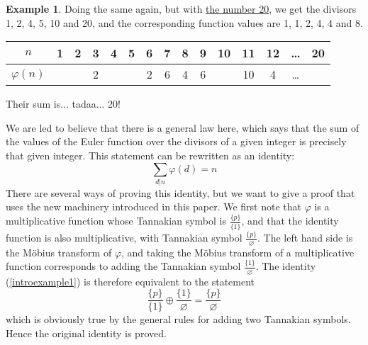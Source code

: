 \documentclass[a4paper]{article}
\theoremstyle{definition}
\newtheorem{example}{Example}[section]
\theoremstyle{remark}
\begin{document}
\begin{example}
Doing the same again, but with \underline{the number 20}, we get the divisors 1, 2, 4, 5, 10 and 20, and the corresponding function values are 1, 1, 2, 4, 4 and 8. 

\vspace{6pt}
\begin{tabular}{  | c || c | c | c | c | c | c | c | c | c | c | c | c | c | c |  }
  \hline			
  $n$ & \bf{1} & \bf{2} & 3 & \bf{4} & \bf{5} & 6 & 7 & 8 & 9 & \bf{10} & 11 & 12 & \ldots & \bf{20}  \\
  \hline
  $\varphi(n) $ & \raisebox{.5pt}{\textcircled{\raisebox{-.9pt} {1}}} & \raisebox{.5pt}{\textcircled{\raisebox{-.9pt} {1}}} & 2 &  \raisebox{.5pt}{\textcircled{\raisebox{-.9pt} {2}}} &  \raisebox{.5pt}{\textcircled{\raisebox{-.9pt} {4}}} & 2 & 6 & 4 & 6 &  \raisebox{.5pt}{\textcircled{\raisebox{-.9pt} {4}}} & 10 & 4 & \ldots &  \raisebox{.5pt}{\textcircled{\raisebox{-.9pt} {8}}}  \\
  \hline  
\end{tabular}
\vspace{6pt}

Their sum is... tadaa... 20!

We are led to believe that there is a general law here, which says that the sum of the values of the Euler function over the divisors of a given integer is precisely that given integer. This statement can be rewritten as an identity:
\begin{equation} \label{introexample1}
\sum_{d \vert n} \varphi(d) = n  
\end{equation}
There are several ways of proving this identity, but we want to give a proof that uses the new machinery introduced in this paper. We first note that $\varphi$ is a multiplicative function whose Tannakian symbol is $\frac{ \{ p  \} }{ \{  1 \}  }$, and that the identity function is also multiplicative, with Tannakian symbol $\frac{ \{ p  \} }{ \varnothing  }$. The left hand side is the M{\"o}bius transform of $\varphi$, and taking the M{\"o}bius transform of a multiplicative function corresponds to adding the Tannakian symbol $\frac{ \{ 1  \} }{ \varnothing } $. The identity (\ref{introexample1}) is therefore equivalent to the statement 
\begin{equation}
\frac{ \{ p  \} }{ \{  1 \}  } \oplus \frac{ \{ 1  \} }{ \varnothing  } = \frac{ \{ p  \} }{ \varnothing  }
\end{equation}
which is obviously true by the general rules for adding two Tannakian symbols. Hence the original identity is proved.
\end{example}
\end{document}
